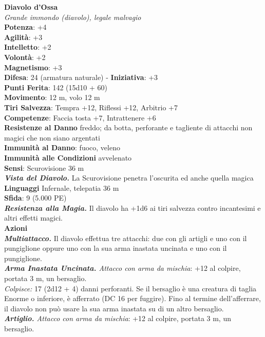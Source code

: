 \begin{multicols}{2}
\medskip\textbf{Diavolo d'Ossa}\\
\emph{Grande immondo (diavolo), legale malvagio}\\
\textbf{Potenza}: +4\\
\textbf{Agilità}: +3\\
\textbf{Intelletto}: +2\\
\textbf{Volontà}: +2\\
\textbf{Magnetismo}: +3\\
\textbf{Difesa}: 24 (armatura naturale) - \textbf{Iniziativa}: +3\\
\textbf{Punti Ferita}: 142 (15d10 + 60)\\
\textbf{Movimento}: 12 m, volo 12 m\\
\textbf{Tiri Salvezza}: Tempra +12, Riflessi +12, Arbitrio +7\\
\textbf{Competenze}: Faccia tosta +7, Intrattenere +6\\
\textbf{Resistenze al Danno} freddo; da botta, perforante e tagliente di attacchi non magici che non siano argentati\\
\textbf{Immunità al Danno}: fuoco, veleno\\
\textbf{Immunità alle Condizioni} avvelenato\\
\textbf{Sensi}: Scurovisione 36 m\\
\emph{\textbf{Vista del Diavolo.}} La Scurovisione penetra l'oscurita ed anche quella magica\\
\textbf{Linguaggi} Infernale, telepatia 36 m \\
\textbf{Sfida}: 9 (5.000 PE)\smallskip\\
\emph{\textbf{Resistenza alla Magia.}} Il diavolo ha +1d6 ai tiri salvezza contro incantesimi e altri effetti magici.\\
\smallskip\textbf{Azioni}\\
\emph{\textbf{Multiattacco.}} Il diavolo effettua tre attacchi: due con gli artigli e uno con il pungiglione oppure uno con la sua arma inastata uncinata e uno con il pungiglione.\\
\emph{\textbf{Arma Inastata Uncinata.} Attacco con arma da mischia}: +12 al colpire, portata 3 m, un bersaglio.\\
\emph{Colpisce:} 17 (2d12 + 4) danni perforanti. Se il bersaglio è una creatura di taglia Enorme o inferiore, è afferrato (DC  16 per fuggire). Fino al termine dell'afferrare, il diavolo non può usare la sua arma inastata su di un altro bersaglio.\\
\emph{\textbf{Artiglio.} Attacco con arma da mischia}: +12 al colpire, portata 3 m, un bersaglio.\\

\end{multicols}
